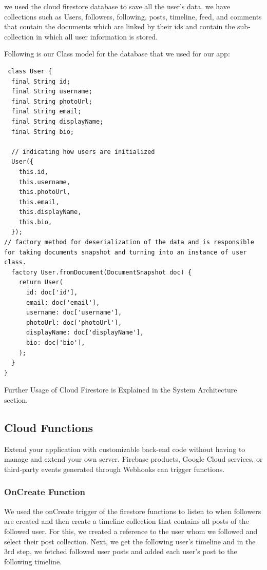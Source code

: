 we used the cloud firestore database to save all the user's data. we have collections such as Users, followers, following, posts, timeline, feed, and comments that contain the documents which are linked by their ids and contain the sub-collection in which all user information is stored.

Following is our Class model for the database that we used for our app:

\begin{verbatim}
 class User {
  final String id;
  final String username;
  final String photoUrl;
  final String email;
  final String displayName;
  final String bio;

  // indicating how users are initialized
  User({
    this.id,
    this.username,
    this.photoUrl,
    this.email,
    this.displayName,
    this.bio,
  });
// factory method for deserialization of the data and is responsible for taking documents snapshot and turning into an instance of user class.
  factory User.fromDocument(DocumentSnapshot doc) {
    return User(
      id: doc['id'],
      email: doc['email'],
      username: doc['username'],
      photoUrl: doc['photoUrl'],
      displayName: doc['displayName'],
      bio: doc['bio'],
    );
  }
}
\end{verbatim}
Further Usage of Cloud Firestore is Explained in the System Architecture section.
\subsection{Cloud Functions}
Extend your application with customizable back-end code without having to manage and extend your own server. Firebase products, Google Cloud services, or third-party events generated through Webhooks can trigger functions.
\subsubsection{OnCreate Function}
We used the onCreate trigger of the firestore functions to listen to when followers are created and then create a timeline collection that contains 
all posts of the followed user. For this, we created a reference to the user whom we followed and select their post collection. Next, we get the following user's timeline and in the 3rd step, we fetched followed user posts and added each user's post to the following timeline. 

